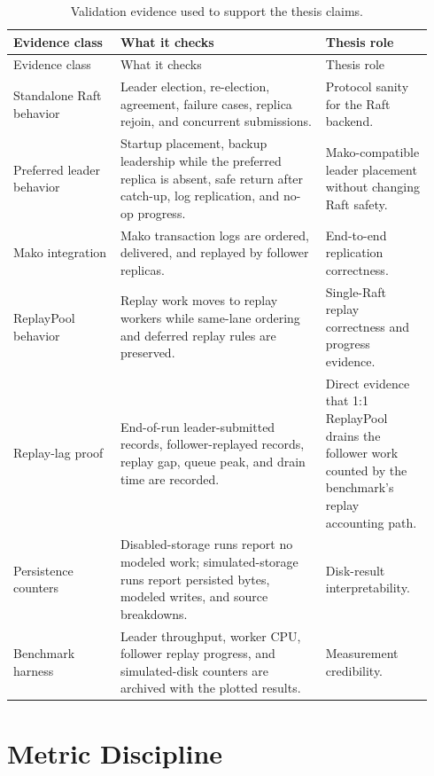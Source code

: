 \begingroup
\small
\setlength{\tabcolsep}{4pt}
\renewcommand{\arraystretch}{0.96}
\begin{longtable}{@{}>{\raggedright\arraybackslash}p{0.24\linewidth}
>{\raggedright\arraybackslash}p{0.46\linewidth}
>{\raggedright\arraybackslash}p{0.24\linewidth}@{}}
\caption[Validation evidence]{Validation evidence used to support the thesis claims.}
\label{tab:validation-matrix}\\
\toprule
Evidence class & What it checks & Thesis role \\
\midrule
\endfirsthead
\toprule
Evidence class & What it checks & Thesis role \\
\midrule
\endhead
Standalone Raft behavior & Leader election, re-election, agreement, failure cases, replica rejoin, and concurrent submissions. & Protocol sanity for the Raft backend. \\
\addlinespace
Preferred leader behavior & Startup placement, backup leadership while the preferred replica is absent, safe return after catch-up, log replication, and no-op progress. & Mako-compatible leader placement without changing Raft safety. \\
\addlinespace
Mako integration & Mako transaction logs are ordered, delivered, and replayed by follower replicas. & End-to-end replication correctness. \\
\addlinespace
ReplayPool behavior & Replay work moves to replay workers while same-lane ordering and deferred replay rules are preserved. & Single-Raft replay correctness and progress evidence. \\
\addlinespace
Replay-lag proof & End-of-run leader-submitted records, follower-replayed records, replay gap, queue peak, and drain time are recorded. & Direct evidence that 1:1 ReplayPool drains the follower work counted by the benchmark's replay accounting path. \\
\addlinespace
Persistence counters & Disabled-storage runs report no modeled work; simulated-storage runs report persisted bytes, modeled writes, and source breakdowns. & Disk-result interpretability. \\
\addlinespace
Benchmark harness & Leader throughput, worker CPU, follower replay progress, and simulated-disk counters are archived with the plotted results. & Measurement credibility. \\
\bottomrule
\end{longtable}
\endgroup

\section{Metric Discipline}

